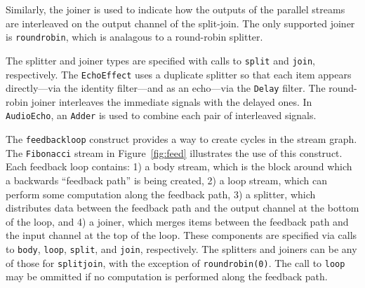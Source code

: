 
Similarly,  the joiner  is used  to indicate  how the  outputs  of the
parallel  streams  are  interleaved  on  the  output  channel  of  the
split-join.  The  only supported joiner  is \texttt{roundrobin}, which
is analagous to a round-robin splitter.

The   splitter  and  joiner   types  are   specified  with   calls  to
\texttt{split}      and     \texttt{join},      respectively.      The
\texttt{EchoEffect}  uses  a  duplicate  splitter so  that  each  item
appears directly---via the identity filter---and as an echo---via the
\texttt{Delay} filter. The round-robin joiner interleaves the
immediate signals  with the  delayed ones.  In  \texttt{AudioEcho}, an
\texttt{Adder} is used to combine each pair of interleaved signals.

The \texttt{feedbackloop} construct provides a way to create cycles in
the    stream    graph.      The    \texttt{Fibonacci}    stream    in
Figure~\ref{fig:feed}  illustrates the  use of  this  construct.  Each
feedback loop  contains: 1) a body  stream, which is  the block around
which  a backwards  ``feedback  path''  is being  created,  2) a  loop
stream, which can perform some computation along the feedback path, 3)
a splitter, which  distributes data between the feedback  path and the
output  channel at  the bottom  of the  loop, and  4) a  joiner, which
merges items  between the feedback path  and the input  channel at the
top  of  the  loop.   These  components are  specified  via  calls  to
\texttt{body},   \texttt{loop},  \texttt{split},   and  \texttt{join},
respectively.
%
%
The splitters and joiners can  be any of those for \texttt{splitjoin},
with   the   exception  of   \texttt{roundrobin(0)}.    The  call   to
\texttt{loop} may be ommitted if no computation is performed along the
feedback path.

